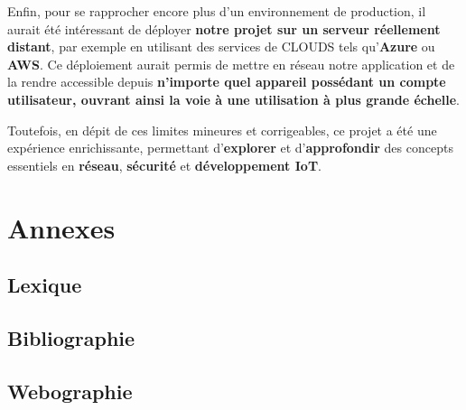 \documentclass[10pt, a4paper]{report}
\begin{document}
	Enfin, pour se rapprocher encore plus d’un environnement de production, il aurait été intéressant de déployer \textbf{notre projet sur un serveur réellement distant}, par exemple en utilisant des services de CLOUDS tels qu’\textbf{Azure} ou \textbf{AWS}. Ce déploiement aurait permis de mettre en réseau notre application et de la rendre accessible depuis \textbf{n’importe quel appareil possédant un compte utilisateur, ouvrant ainsi la voie à une utilisation à plus grande échelle}. 
	
	Toutefois, en dépit de ces limites mineures et corrigeables, ce projet a été une expérience enrichissante, permettant d’\textbf{explorer} et d’\textbf{approfondir} des concepts essentiels en \textbf{réseau}, \textbf{sécurité} et \textbf{développement IoT}.	
	
	\appendix
	\chapter{Annexes}
	\section{Lexique}
	\section{Bibliographie}
	\section{Webographie}
	
	
	
		
	
	\nocite{*}
	
	
	
	\clearpage
	
	\printglossaries
	
	
\end{document}
